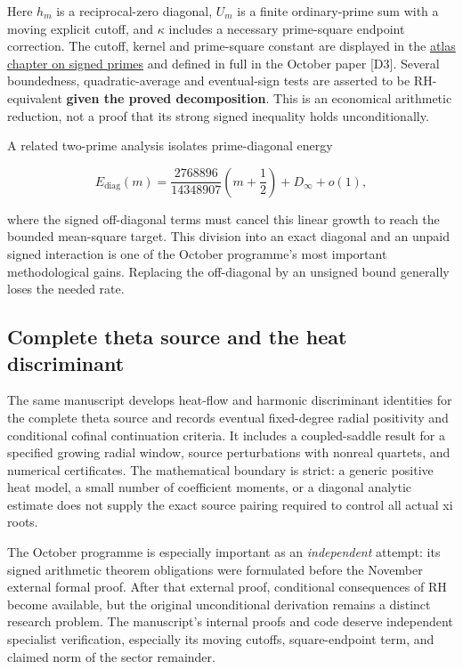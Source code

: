 \documentclass[
  10pt,
  a4paper,
  10pt,
  oneside,
  openany]{book}
\begin{document}
Here \(h_m\) is a reciprocal-zero diagonal, \(U_m\) is a finite
ordinary-prime sum with a moving explicit cutoff, and \(\kappa\)
includes a necessary prime-square endpoint correction. The cutoff,
kernel and prime-square constant are displayed in the
\hyperref[atlas-primes]{atlas chapter on signed primes} and defined in
full in the October paper {[}D3{]}. Several boundedness,
quadratic-average and eventual-sign tests are asserted to be
RH-equivalent \textbf{given the proved decomposition}. This is an
economical arithmetic reduction, not a proof that its strong signed
inequality holds unconditionally.

A related two-prime analysis isolates prime-diagonal energy

\[
E_{\mathrm{diag}}(m)
=\frac{2768896}{14348907}\left(m+\frac12\right)
+D_\infty+o(1),
\tag{S7.2}\label{eq:S7.2}
\]

where the signed off-diagonal terms must cancel this linear growth to
reach the bounded mean-square target. This division into an exact
diagonal and an unpaid signed interaction is one of the October
programme's most important methodological gains. Replacing the
off-diagonal by an unsigned bound generally loses the needed rate.

\subsection{Complete theta source and the heat
discriminant}\label{complete-theta-source-and-the-heat-discriminant}

The same manuscript develops heat-flow and harmonic discriminant
identities for the complete theta source and records eventual
fixed-degree radial positivity and conditional cofinal continuation
criteria. It includes a coupled-saddle result for a specified growing
radial window, source perturbations with nonreal quartets, and numerical
certificates. The mathematical boundary is strict: a generic positive
heat model, a small number of coefficient moments, or a diagonal
analytic estimate does not supply the exact source pairing required to
control all actual xi roots.

The October programme is especially important as an \emph{independent}
attempt: its signed arithmetic theorem obligations were formulated
before the November external formal proof. After that external proof,
conditional consequences of RH become available, but the original
unconditional derivation remains a distinct research problem. The
manuscript's internal proofs and code deserve independent specialist
verification, especially its moving cutoffs, square-endpoint term, and
claimed norm of the sector remainder.
\end{document}
